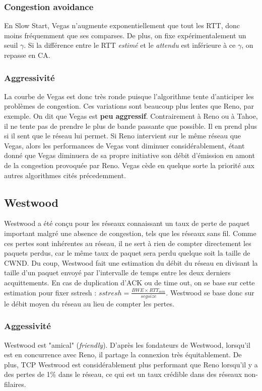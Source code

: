 \documentclass[	DIV=calc,%
							paper=a4,%
							fontsize=11pt,%
							twocolumn]{scrartcl}	 					%
\begin{document}
\subsubsection*{Congestion avoidance}
En Slow Start, Vegas n'augmente exponentiellement que tout les RTT, donc moins fréquemment que ses comparses. De plus, on fixe expérimentalement un seuil $\gamma$. Si la différence entre le RTT \textit{estimé} et le \textit{attendu} est inférieure à ce $\gamma$, on repasse en CA.
\subsubsection*{Aggressivité}
La courbe de Vegas est donc très ronde puisque l'algorithme tente d'anticiper les problèmes de congestion. Ces variations sont beaucoup plus lentes que Reno, par exemple. On dit que Vegas est \textbf{peu aggressif}. Contrairement à Reno ou à Tahoe, il ne tente pas de prendre le plus de bande passante que possible. Il en prend plus si il sent que le réseau lui permet. Si Reno intervient sur le même réseau que Vegas, alors les performances de Vegas vont diminuer considérablement, étant donné que Vegas diminuera de sa propre initiative son débit d'émission en amont de la congestion provoquée par Reno. Vegas cède en quelque sorte la priorité aux autres algorithmes cités précedemment.

\subsection*{Westwood}
Westwood a été conçu pour les réseaux connaissant un taux de perte de paquet important malgré une absence de congestion, tels que les réseaux sans fil. Comme ces pertes sont inhérentes au réseau, il ne sert à rien de compter directement les paquets perdus, car le même taux de paquet sera perdu quelque soit la taille de CWND. Du coup, Westwood fait une estimation du débit du réseau en divisant la taille d'un paquet envoyé par l'intervalle de temps entre les deux derniers acquittements. En cas de duplication d'ACK ou de time out, on se base sur cette estimation pour fixer sstresh : $sstresh=\frac{BWE \times RTT_{min}}{segsize} $. Westwood se base donc sur le débit moyen du réseau au lieu de compter les pertes.

\subsubsection*{Aggessivité}
Westwood est "amical" (\textit{friendly}). D'après les fondateurs de Westwood, lorsqu'il est en concurrence avec Reno, il partage la connexion très équitablement. De plus, TCP Westwood est considérablement plus performant que Reno lorsqu'il y a des pertes de 1\% dans le réseau, ce qui est un taux crédible dans des réseaux non-filaires.
\end{document}
